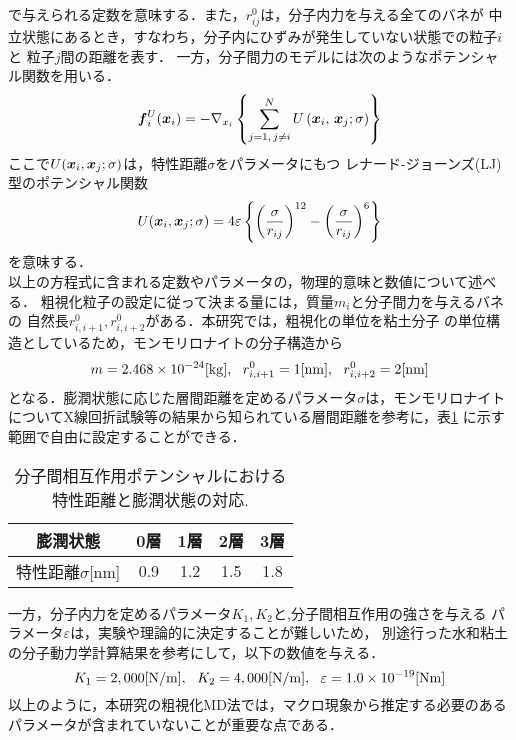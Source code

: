 で与えられる定数を意味する．また，$r^0_{ij}$は，分子内力を与える全てのバネが
中立状態にあるとき，すなわち，分子内にひずみが発生していない状態での粒子$i$と
粒子$j$間の距離を表す．
一方，分子間力のモデルには次のようなポテンシャル関数を用いる．
\begin{equation}
	\mbox{\boldmath $f$}_i^U(\mbox{\boldmath $x$}_i)
	=
	-\nabla_{x_i} 
	\left\{ 
		\sum_{j=1, \, j \neq i}^N U\left(\mbox{\boldmath $x$}_i,\,\mbox{\boldmath $x$}_j; \sigma \right)
	\right\}
	\label{eqn:}
\end{equation}
ここで$U(\mbox{\boldmath $x$}_i,\mbox{\boldmath $x$}_j;\sigma)$は，特性距離$\sigma$をパラメータにもつ
レナード-ジョーンズ(LJ)型のポテンシャル関数
\begin{equation}
	U(\mbox{\boldmath $x$}_i,\mbox{\boldmath $x$}_j; \sigma) 
	= 4 \varepsilon 
	\left\{ 
	\left(\frac{\sigma}{r_{ij}}\right)^{12}
	-
	\left(\frac{\sigma}{r_{ij}}\right)^6
	\right\}
	\label{eqn:}
\end{equation}
を意味する．\\

以上の方程式に含まれる定数やパラメータの，物理的意味と数値について述べる．
粗視化粒子の設定に従って決まる量には，質量$m_i$と分子間力を与えるバネの
自然長$r^0_{i,i+1}, r^0_{i,i+2}$がある．本研究では，粗視化の単位を粘土分子
の単位構造としているため，モンモリロナイトの分子構造から
\begin{equation}
	m=2.468\times 10 ^{-24}[{\rm kg}]
	, \ \ 
	r^0_{i,i+1}=1[{\rm nm}], \ \ 
	r^0_{i,i+2}=2[{\rm nm}]
	\label{eqn:}
\end{equation}
となる．膨潤状態に応じた層間距離を定めるパラメータ$\sigma$は，モンモリロナイト
についてX線回折試験等の結果から知られている層間距離を参考に，表\ref{tbl:tbl_sig}
に示す範囲で自由に設定することができる．
\begin{table}[h]
	\begin{center}
	\caption{分子間相互作用ポテンシャルにおける特性距離と膨潤状態の対応.}
	\vspace{3mm}
	\begin{tabular}{c||c|c|c|c}
		膨潤状態 & 0層 & 1層 & 2層 & 3層 \\
		\hline
		特性距離$\sigma$[{\rm nm}]& 0.9 & 1.2 & 1.5 & 1.8 \\
	\end{tabular}
	\label{tbl:tbl_sig}
	\end{center}
\end{table}
一方，分子内力を定めるパラメータ$K_1, K_2$と,分子間相互作用の強さを与える
パラメータ$\varepsilon$は，実験や理論的に決定することが難しいため，
別途行った水和粘土の分子動力学計算結果を参考にして，以下の数値を与える．
\begin{equation}
	K_1=2,000[{\rm N/m}], \ \ 
	K_2=4,000[{\rm N/m}], \ \ 
	\varepsilon=1.0\times 10^{-19}[{\rm Nm}]
	\label{eqn:}
\end{equation}
以上のように，本研究の粗視化MD法では，マクロ現象から推定する必要のある
パラメータが含まれていないことが重要な点である．
%
